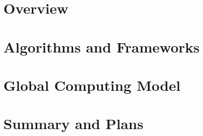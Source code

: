 \documentclass{dune}
\begin{document}
\pagestyle{titlepage}
%
\cleardoublepage


\cleardoublepage

\setcounter{chapter}{-1}

\cleardoublepage

\part{Overview}

\cleardoublepage


\cleardoublepage



\cleardoublepage


\cleardoublepage

\part{Algorithms and Frameworks}






\cleardoublepage


\cleardoublepage


\cleardoublepage


\cleardoublepage


\part{Global Computing Model}




\cleardoublepage



\cleardoublepage



\cleardoublepage


% 


% 


% 


% 


\cleardoublepage



\cleardoublepage



\cleardoublepage

\part{Summary and Plans}




\end{document}
